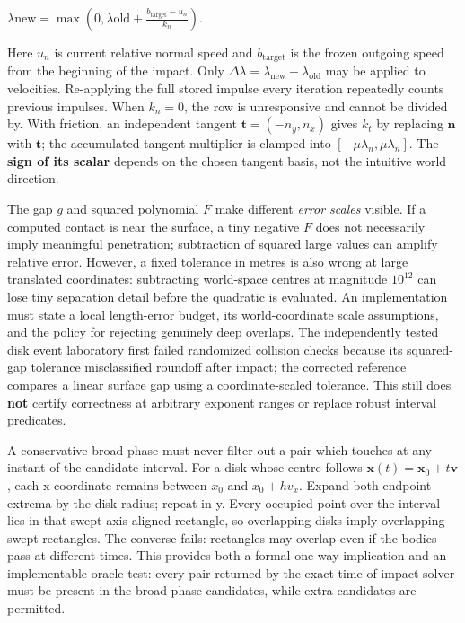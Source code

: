 \(\lambda{\mathrm{new}} =\max\left(0,\lambda{\mathrm{old}}+ \frac{b_{\mathrm{target}}-u_n}{k_n}\right).\)

Here \(u_n\) is current relative normal speed and \(b_{\mathrm{target}}\) is the frozen outgoing speed from the beginning of the impact. Only \(\Delta\lambda=\lambda_{\mathrm{new}}-\lambda_{\mathrm{old}}\) may be applied to velocities. Re-applying the full stored impulse every iteration repeatedly counts previous impulses. When \(k_n=0\), the row is unresponsive and cannot be divided by. With friction, an independent tangent \(\mathbf t=(-n_y,n_x)\) gives \(k_t\) by replacing \(\mathbf n\) with \(\mathbf t\); the accumulated tangent multiplier is clamped into \([-\mu\lambda_n,\mu\lambda_n]\). The \textbf{sign of its scalar} depends on the chosen tangent basis, not the intuitive world direction.

The gap \(g\) and squared polynomial \(F\) make different \emph{error scales} visible. If a computed contact is near the surface, a tiny negative \(F\) does not necessarily imply meaningful penetration; subtraction of squared large values can amplify relative error. However, a fixed tolerance in metres is also wrong at large translated coordinates: subtracting world-space centres at magnitude \(10^{12}\) can lose tiny separation detail before the quadratic is evaluated. An implementation must state a local length-error budget, its world-coordinate scale assumptions, and the policy for rejecting genuinely deep overlaps. The independently tested disk event laboratory first failed randomized collision checks because its squared-gap tolerance misclassified roundoff after impact; the corrected reference compares a linear surface gap using a coordinate-scaled tolerance. This still does \textbf{not} certify correctness at arbitrary exponent ranges or replace robust interval predicates.

A conservative broad phase must never filter out a pair which touches at any instant of the candidate interval. For a disk whose centre follows \(\mathbf x(t)=\mathbf x_0+t\mathbf v\), each x coordinate remains between \(x_0\) and \(x_0+hv_x\). Expand both endpoint extrema by the disk radius; repeat in y. Every occupied point over the interval lies in that swept axis-aligned rectangle, so overlapping disks imply overlapping swept rectangles. The converse fails: rectangles may overlap even if the bodies pass at different times. This provides both a formal one-way implication and an implementable oracle test: every pair returned by the exact time-of-impact solver must be present in the broad-phase candidates, while extra candidates are permitted.

